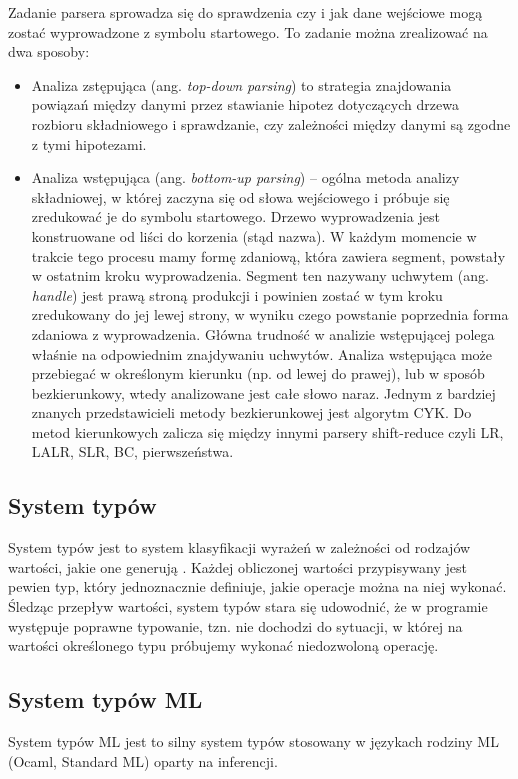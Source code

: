 \documentclass{article}
\begin{document}
Zadanie parsera sprowadza się do sprawdzenia czy i jak dane wejściowe mogą zostać wyprowadzone z symbolu startowego. To zadanie można zrealizować na dwa sposoby:


\begin{itemize}
  \item Analiza zstępująca (ang. \emph{top-down parsing}) to strategia znajdowania powiązań między danymi przez stawianie hipotez dotyczących drzewa rozbioru składniowego i sprawdzanie, czy zależności między danymi są zgodne z tymi hipotezami.
  \item Analiza wstępująca (ang. \emph{bottom-up parsing}) – ogólna metoda analizy składniowej, w której zaczyna się od słowa wejściowego i próbuje się zredukować je do symbolu startowego. Drzewo wyprowadzenia jest konstruowane od liści do korzenia (stąd nazwa). W każdym momencie w trakcie tego procesu mamy formę zdaniową, która zawiera segment, powstały w ostatnim kroku wyprowadzenia. Segment ten nazywany uchwytem (ang. \emph{handle}) jest prawą stroną produkcji i powinien zostać w tym kroku zredukowany do jej lewej strony, w wyniku czego powstanie poprzednia forma zdaniowa z wyprowadzenia. Główna trudność w analizie wstępującej polega właśnie na odpowiednim znajdywaniu uchwytów.
        Analiza wstępująca może przebiegać w określonym kierunku (np. od lewej do prawej), lub w sposób bezkierunkowy, wtedy analizowane jest całe słowo naraz. Jednym z bardziej znanych przedstawicieli metody bezkierunkowej jest algorytm CYK. Do metod kierunkowych zalicza się między innymi parsery shift-reduce czyli LR, LALR, SLR, BC, pierwszeństwa.
\end{itemize}



\subsection{System typów}
System typów jest to system klasyfikacji wyrażeń w zależności od rodzajów wartości, jakie one generują \cite{Pierce__Benjamin__C__2002}. Każdej obliczonej wartości przypisywany jest pewien typ, który jednoznacznie definiuje, jakie operacje można na niej wykonać. Śledząc przepływ wartości, system typów stara się udowodnić, że w programie występuje poprawne typowanie, tzn. nie dochodzi do sytuacji, w której na wartości określonego typu próbujemy wykonać niedozwoloną operację.
\subsection{System typów ML} System typów ML jest to silny system typów stosowany w językach rodziny ML (Ocaml, Standard ML) oparty na inferencji.
\end{document}
